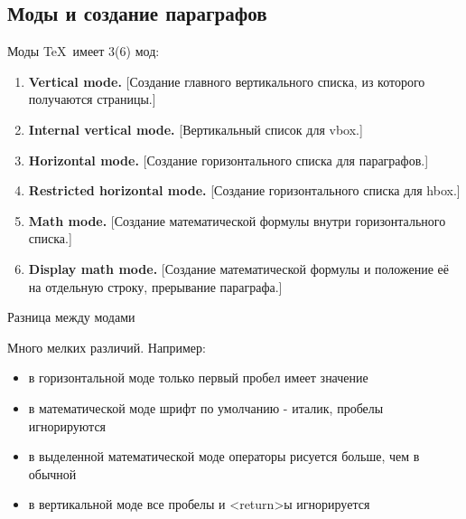 \subsection{Моды и создание параграфов}
\begin{frame}{Моды\magicPage}\relax
\small
\TeX\ имеет 3(6) мод:
\footnotesize
\begin{enumerate}
    \item {\bfseries {\ccsc Vertical} mode.} [Создание главного вертикального списка, из которого получаются страницы.]
\item {\bfseries Internal {\ccsc vertical} mode.} [Вертикальный список для vbox.]
\item {\bfseries {\ccsc Horizontal} mode.} [Создание горизонтального списка для параграфов.]
\item {\bfseries Restricted {\ccsc horizontal} mode.} [Создание горизонтального списка для hbox.]
\item {\bfseries {\ccsc Math} mode.} [Создание математической формулы внутри горизонтального списка.]
\item {\bfseries Display {\ccsc math} mode.} [Создание математической формулы и положение её на отдельную строку, прерывание параграфа.]
     
\end{enumerate}
     
\end{frame}

\begin{frame}{Разница между модами\magicPage}

    Много мелких различий. Например:
    \begin{itemize}
        \item в горизонтальной моде только первый пробел имеет значение
        \item в математической моде шрифт по умолчанию - италик, пробелы игнорируются
        \item в выделенной математической моде операторы рисуется больше, чем в обычной
        \item в вертикальной моде все пробелы и <return>ы игнорируется
         
    \end{itemize}
\end{frame}

